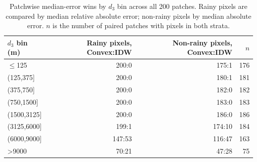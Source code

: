 \begin{table}[t]\centering\begin{tabular}{lrrr}
\toprule $d_3$ bin (m) & Rainy pixels, Convex:IDW & Non-rainy pixels, Convex:IDW & $n$ \\
\midrule
$\leq$125 & 200:0 & 175:1 & 176 \\
(125,375] & 200:0 & 180:1 & 181 \\
(375,750] & 200:0 & 182:0 & 182 \\
(750,1500] & 200:0 & 183:0 & 183 \\
(1500,3125] & 200:0 & 186:0 & 186 \\
(3125,6000] & 199:1 & 174:10 & 184 \\
(6000,9000] & 147:53 & 116:47 & 163 \\
>9000 & 70:21 & 47:28 & 75 \\
\bottomrule\end{tabular}
\caption{Patchwise median-error wins by $d_3$ bin across all 200 patches. Rainy pixels are compared by median relative absolute error; non-rainy pixels by median absolute error. $n$ is the number of paired patches with pixels in both strata.}
\label{tab:distance-bin-win-counts}
\end{table}
